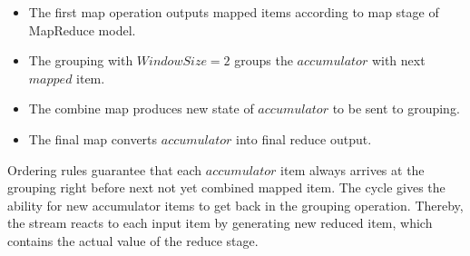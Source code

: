 \begin{itemize}
  \item The first map operation outputs mapped items according to map stage of MapReduce model.
  
  \item The grouping with $WindowSize=2$ groups the $accumulator$  with next $mapped$  item. 
  
  \item The combine map  produces new state of $accumulator$ to be sent  to grouping.
  
  \item The final map converts $accumulator$ into final reduce output.
\end{itemize}

Ordering rules  guarantee that each $accumulator$  item always arrives at the grouping right before next not yet combined mapped item.
The cycle gives the ability for new accumulator items to get back in the grouping operation. 
Thereby, the stream reacts to each input item by generating new reduced item, which contains the actual value of the reduce stage.



